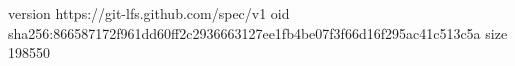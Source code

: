 version https://git-lfs.github.com/spec/v1
oid sha256:866587172f961dd60ff2c2936663127ee1fb4be07f3f66d16f295ac41c513c5a
size 198550
